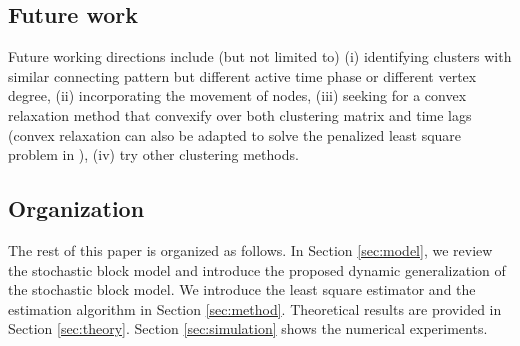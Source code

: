 \subsection*{Future work}
Future working directions include (but not limited to)
	(i) identifying clusters with similar connecting pattern but different active time phase or different vertex degree,
	(ii) incorporating the movement of nodes,
	(iii) seeking for a convex relaxation method that convexify over both clustering matrix and time lags
	(convex relaxation can also be adapted to solve the penalized least square problem in \citet{Pensky2019a}),
	(iv) try other clustering methods.





\subsection*{Organization}
The rest of this paper is organized as follows. 
In Section \ref{sec:model}, we review the stochastic block model and introduce the proposed dynamic generalization of the stochastic block model.
We introduce the least square estimator and the estimation algorithm in Section \ref{sec:method}.
Theoretical results are provided in Section \ref{sec:theory}. Section \ref{sec:simulation} shows the numerical experiments.



